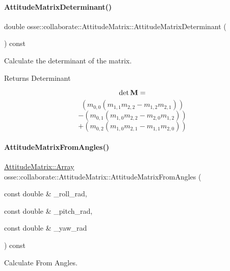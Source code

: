 \paragraph{\texorpdfstring{Attitude\+Matrix\+Determinant()}{AttitudeMatrixDeterminant()}}
{\footnotesize\ttfamily double osse\+::collaborate\+::\+Attitude\+Matrix\+::\+Attitude\+Matrix\+Determinant (\begin{DoxyParamCaption}{ }\end{DoxyParamCaption}) const\hspace{0.3cm}{\ttfamily [private]}}



Calculate the determinant of the matrix. 

\begin{DoxyReturn}{Returns}
Determinant
\end{DoxyReturn}
\[ \det{{\bf{M}}} = \] \[ (m_{0,0} (m_{1,1}m_{2,2} - m_{1,2}m_{2,1})) \] \[ -(m_{0,1} (m_{1,0}m_{2,2} - m_{2,0}m_{1,2})) \] \[ +(m_{0,2} (m_{1,0}m_{2,1} - m_{1,1}m_{2,0})) \] \mbox{\label{classosse_1_1collaborate_1_1_attitude_matrix_a4c9220dfc49995fadcfce4f9f71ee33d}} 
\paragraph{\texorpdfstring{Attitude\+Matrix\+From\+Angles()}{AttitudeMatrixFromAngles()}}
{\footnotesize\ttfamily \hyperlink{classosse_1_1collaborate_1_1_attitude_matrix_a0200c3caaa4dc8e80288a9608ef7ccd3}{Attitude\+Matrix\+::\+Array} osse\+::collaborate\+::\+Attitude\+Matrix\+::\+Attitude\+Matrix\+From\+Angles (\begin{DoxyParamCaption}\item[{const double \&}]{\+\_\+roll\+\_\+rad,  }\item[{const double \&}]{\+\_\+pitch\+\_\+rad,  }\item[{const double \&}]{\+\_\+yaw\+\_\+rad }\end{DoxyParamCaption}) const\hspace{0.3cm}{\ttfamily [private]}}



Calculate From Angles. 


